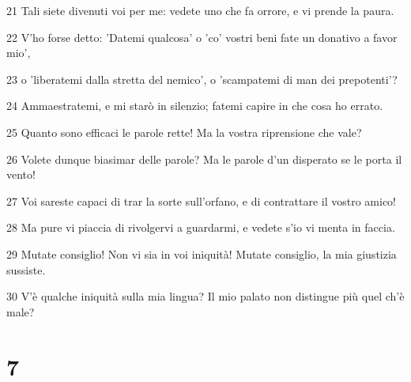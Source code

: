 \par 21 Tali siete divenuti voi per me: vedete uno che fa orrore, e vi prende la paura.
\par 22 V'ho forse detto: 'Datemi qualcosa' o 'co' vostri beni fate un donativo a favor mio',
\par 23 o 'liberatemi dalla stretta del nemico', o 'scampatemi di man dei prepotenti'?
\par 24 Ammaestratemi, e mi starò in silenzio; fatemi capire in che cosa ho errato.
\par 25 Quanto sono efficaci le parole rette! Ma la vostra riprensione che vale?
\par 26 Volete dunque biasimar delle parole? Ma le parole d'un disperato se le porta il vento!
\par 27 Voi sareste capaci di trar la sorte sull'orfano, e di contrattare il vostro amico!
\par 28 Ma pure vi piaccia di rivolgervi a guardarmi, e vedete s'io vi menta in faccia.
\par 29 Mutate consiglio! Non vi sia in voi iniquità! Mutate consiglio, la mia giustizia sussiste.
\par 30 V'è qualche iniquità sulla mia lingua? Il mio palato non distingue più quel ch'è male?

\chapter{7}

